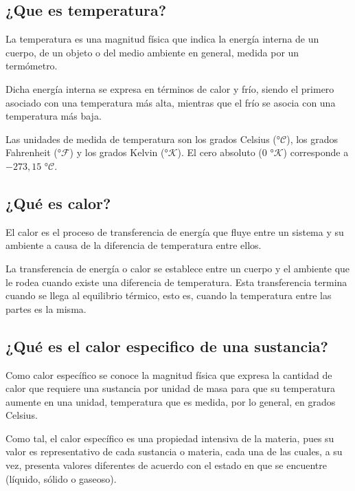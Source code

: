 \documentclass[twocolumn, 12pt]{article}
\newcommand{\Celsius}[0]{°$\mathcal{C}$}
\newcommand{\Kelvin}[0]{°$\mathcal{K}$}
\newcommand{\Fahrenheit}[0]{°$\mathcal{F}$}
\begin{document}
\subsection{¿Que es temperatura?~\cite{Significados_2022_temperatura}}

La temperatura es una magnitud física que indica la energía
interna de un cuerpo, de un objeto o del medio ambiente en
general, medida por un termómetro.

Dicha energía interna se expresa en términos de calor y
frío, siendo el primero asociado con una temperatura más
alta, mientras que el frío se asocia con una temperatura
más baja.

Las unidades de medida de temperatura son los grados
Celsius (\Celsius), los grados Fahrenheit (\Fahrenheit) y
los grados Kelvin (\Kelvin). El cero absoluto (0 \Kelvin)
corresponde a $-273,15$ \Celsius.

\subsection{¿Qué es calor?~\cite{Fernandes_2022_calor}}

El calor es el proceso de transferencia de energía que
fluye entre un sistema y su ambiente a causa de la
diferencia de temperatura entre ellos.

La transferencia de energía o calor se establece entre un
cuerpo y el ambiente que le rodea cuando existe una
diferencia de temperatura. Esta transferencia termina
cuando se llega al equilibrio térmico, esto es, cuando la
temperatura entre las partes es la misma.

\subsection{¿Qué es el calor especifico de una sustancia?~\cite{Fernandes_2022_calor}~\cite{Significados_2016_calorEspecifico}}

Como calor específico se conoce la magnitud física que
expresa la cantidad de calor que requiere una sustancia por
unidad de masa para que su temperatura aumente en una
unidad, temperatura que es medida, por lo general, en
grados Celsius.

Como tal, el calor específico es una propiedad intensiva de
la materia, pues su valor es representativo de cada
sustancia o materia, cada una de las cuales, a su vez,
presenta valores diferentes de acuerdo con el estado en que
se encuentre (líquido, sólido o gaseoso).
\end{document}
